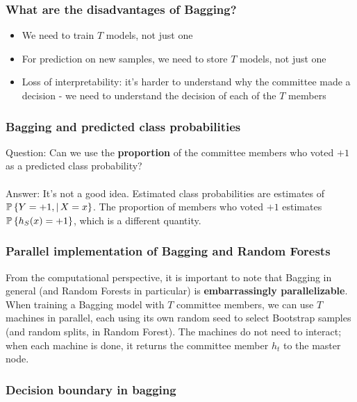 \subsubsection*{What are the disadvantages of Bagging?}

\begin{itemize}
  \item We need to train $T$ models, not just one
  \item For prediction on new samples, we need to store $T$ models, not just one
  \item Loss of interpretability: it's harder to understand why the committee
    made a decision - we need to understand the decision of each of the $T$
    members
\end{itemize}

\subsubsection*{Bagging and predicted class probabilities}

\noindent 
Question: Can we use the {\bf proportion} of the committee members who voted
$+1$ as a predicted class probability? 
\\~\\
Answer: It's not a good idea. Estimated class probabilities are estimates of 
$\operatorname*{\mathbb{P}}\left\{ Y=+1,|\, X=x \right\}$. The proportion of  members who voted
$+1$ estimates $\operatorname*{\mathbb{P}}\left\{ h_S(x)=+1 \right\}$, which is a different quantity.


\subsubsection*{Parallel implementation of Bagging and Random Forests}

From the computational perspective, it is important to note 
that Bagging in general (and Random Forests in particular) is {\bf embarrassingly
parallelizable}. When training a Bagging model with $T$ committee members, we
can use $T$ machines in parallel, each using its own random seed to select
Bootstrap samples (and random splits, in Random Forest). The machines do not
need to interact; when each machine is done, it returns the committee member
$h_t$ to the master node. 


\subsubsection*{Decision boundary in bagging}

